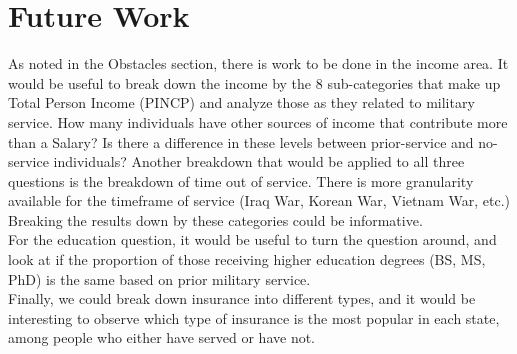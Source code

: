 \documentclass{article}
\begin{document}
\section{Future Work}
As noted in the Obstacles section, there is work to be done in the income area. It would be useful to break down the income by the 8 sub-categories that make up Total Person Income (PINCP) and analyze those as they related to military service. How many individuals have other sources of income that contribute more than a Salary? Is there a difference in these levels between prior-service and no-service individuals? Another breakdown that would be applied to all three questions is the breakdown of time out of service. There is more granularity available for the timeframe of service (Iraq War, Korean War, Vietnam War, etc.) Breaking the results down by these categories could be informative.\\ 

For the education question, it would be useful to turn the question around, and look at if the proportion of those receiving higher education degrees (BS, MS, PhD) is the same based on prior military service.\\

Finally, we could break down insurance into different types, and it would be interesting to observe which type of insurance is the most popular in each state, among people who either have served or have not.
\end{document}
